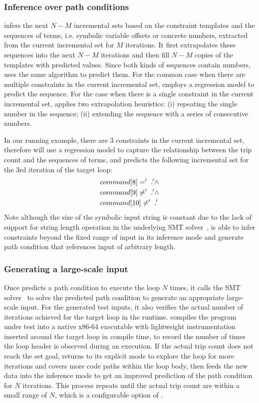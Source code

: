 \subsubsection{Inference over path conditions}
\label{sec:constraint-inference}
\lancet infers the next $N-M$ incremental sets based on the constraint templates and the sequences of terms, i.e. symbolic variable offsets or concrete numbers, extracted from the current incremental set for $M$ iterations.
It first extrapolates these sequences into the next $N-M$ iterations and then fill $N-M$ copies of the templates with predicted values.
Since both kinds of sequences contain numbers, \lancet uses the same algorithm to predict them.
For the common case when there are multiple constraints in the current incremental set, \lancet employs a regression model to predict the sequence.
For the case when there is a single constraint in the current incremental set, \lancet applies two extrapolation heuristics: (i) repeating the single number in the sequence; (ii) extending the sequence with a series of consecutive numbers.

In our running example, there are 3 constraints in the current incremental set, therefore \lancet will use a regression model to capture the relationship between the trip count and the sequences of terms, and predicts the following incremental set for the 3rd iteration of the target loop:
\begin{align*}
   command&[8] = '\vartextvisiblespace' \land\\
   command&[9] \neq '\vartextvisiblespace' \land\\
   command&[10] \neq '\vartextvisiblespace'
\end{align*}
Note although the size of the symbolic input string is constant due to the lack of support for string length operation in the underlying SMT solver~\cite{stp}, \lancet is able to infer constraints beyond the fixed range of input in its inference mode and generate path condition that references input of arbitrary length.


\subsubsection{Generating a large-scale input}
\label{sec:input-generation}
Once \lancet predicts a path condition to execute the loop $N$ times, it calls the SMT solver~\cite{stp} to solve the predicted path condition to generate an appropriate large-scale input.
For the generated test inputs, it also verifies the actual number of iterations achieved for the target loop in the runtime.
\lancet compiles the program under test into a native x86-64 executable with lightweight instrumentation inserted around the target loop in compile time, to record the number of times the loop header is observed during an execution.
If the actual trip count does not reach the set goal, \lancet returns to its explicit mode to explore the loop for more iterations and covers more code paths within the loop body, then feeds the new data into the inference mode to get an improved prediction of the path condition for $N$ iterations. This process repeats until the actual trip count are within a small range of $N$, which is a configurable option of \lancet.

